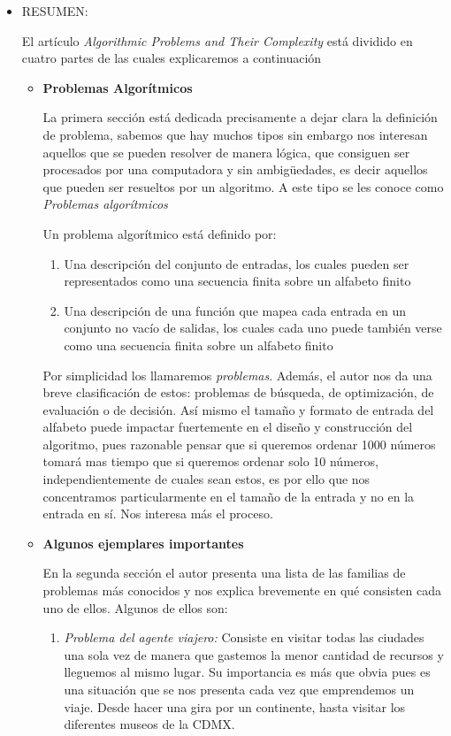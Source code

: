 \documentclass[12pt,letterpaper]{article}
\begin{document}
\begin{itemize}
    \item RESUMEN: 

    El artículo \textit{Algorithmic Problems and Their Complexity} está dividido en cuatro partes de las cuales explicaremos a continuación

    \begin{itemize}[$\blacklozenge$]
    \item \textbf{Problemas Algorítmicos} 
    
    La primera sección está dedicada precisamente a dejar clara la definición de problema, sabemos que hay muchos tipos sin embargo nos interesan aquellos que se pueden resolver de manera lógica, que consiguen ser procesados por una computadora y sin ambigüedades, es decir aquellos que pueden ser resueltos por un algoritmo. A este tipo se les conoce como \textit{Problemas algorítmicos}

    Un problema algorítmico está definido por:
    \begin{enumerate}
    \item Una descripción del conjunto de entradas, los cuales pueden ser representados como una secuencia finita sobre un alfabeto finito
    
    \item Una descripción de una función que mapea cada entrada en un conjunto no vacío de salidas, los cuales cada uno puede también verse como una secuencia finita sobre un alfabeto finito
    \end{enumerate}

    Por simplicidad los llamaremos \textit{problemas}. Además, el autor nos da una breve clasificación de estos: problemas de búsqueda, de optimización, de evaluación o de decisión. Así mismo el tamaño y formato de entrada del alfabeto puede impactar fuertemente en el diseño y construcción del algoritmo, pues razonable pensar que si queremos ordenar 1000 números tomará mas tiempo que si queremos ordenar solo 10 números, independientemente de cuales sean estos, es por ello que nos concentramos particularmente en el tamaño de la entrada y no en la entrada en sí. Nos interesa más el proceso.
    
    \item \textbf{Algunos ejemplares importantes}
    
    En la segunda sección el autor presenta una lista de las familias de problemas más conocidos y nos explica brevemente en qué consisten cada uno de ellos. Algunos de ellos son: 
    \begin{enumerate}
        \item \textit{Problema del agente viajero:} Consiste en visitar todas las ciudades una sola vez de manera que gastemos la menor cantidad de recursos y lleguemos al mismo lugar. Su importancia es más que obvia pues es una situación que se nos presenta cada vez que emprendemos un viaje. Desde hacer una gira por un continente, hasta visitar los diferentes museos de la CDMX.
        

\end{enumerate}
\end{itemize}
\end{itemize}
\end{document}
